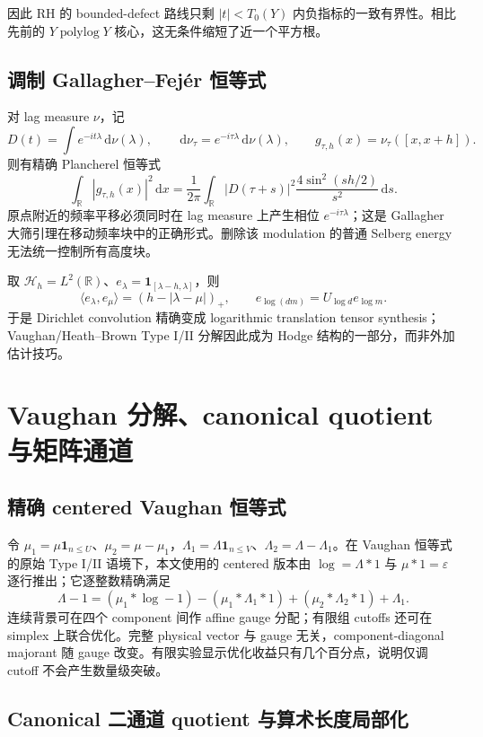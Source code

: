 \documentclass[UTF8,11pt,a4paper]{ctexart}
\theoremstyle{definition}
\theoremstyle{remark}
\newcommand{\R}{\mathbb R}
\newcommand{\dd}{\,\mathrm d}
\newcommand{\1}{\mathbf 1}
\newcommand{\cH}{\mathcal H}
\begin{document}
因此 RH 的 bounded-defect 路线只剩 $|t|<T_0(Y)$ 内负指标的一致有界性。相比先前的 $Y\operatorname{polylog}Y$ 核心，这无条件缩短了近一个平方根。

\subsection{调制 Gallagher--Fej\'er 恒等式}

对 lag measure $\nu$，记
\[
  D(t)=\int e^{-it\lambda}\dd\nu(\lambda),\qquad
  \dd\nu_\tau=e^{-i\tau\lambda}\dd\nu(\lambda),\qquad
  g_{\tau,h}(x)=\nu_\tau([x,x+h]).
\]
则有精确 Plancherel 恒等式
\[
 \int_\R|g_{\tau,h}(x)|^2\dd x
 =\frac1{2\pi}\int_\R|D(\tau+s)|^2
 \frac{4\sin^2(sh/2)}{s^2}\dd s.
\]
原点附近的频率平移必须同时在 lag measure 上产生相位 $e^{-i\tau\lambda}$；这是 Gallagher 大筛引理\cite{Gallagher}在移动频率块中的正确形式。删除该 modulation 的普通 Selberg energy 无法统一控制所有高度块。

取 $\cH_h=L^2(\R)$、$e_\lambda=\1_{[\lambda-h,\lambda]}$，则
\[
 \langle e_\lambda,e_\mu\rangle=(h-|\lambda-\mu|)_+,
 \qquad e_{\log(dm)}=U_{\log d}e_{\log m}.
\]
于是 Dirichlet convolution 精确变成 logarithmic translation tensor synthesis；Vaughan/Heath--Brown Type I/II 分解因此成为 Hodge 结构的一部分，而非外加估计技巧。

\section{Vaughan 分解、canonical quotient 与矩阵通道}

\subsection{精确 centered Vaughan 恒等式}

令 $\mu_1=\mu\1_{n\leq U}$、$\mu_2=\mu-\mu_1$，$\Lambda_1=\Lambda\1_{n\leq V}$、$\Lambda_2=\Lambda-\Lambda_1$。在 Vaughan 恒等式的原始 Type I/II 语境\cite{Vaughan}下，本文使用的 centered 版本由 $\log=\Lambda*1$ 与 $\mu*1=\varepsilon$ 逐行推出；它逐整数精确满足
\[
\boxed{
\Lambda-1=(\mu_1*\log-1)-(\mu_1*\Lambda_1*1)
 +(\mu_2*\Lambda_2*1)+\Lambda_1.}
\]
连续背景可在四个 component 间作 affine gauge 分配；有限组 cutoffs 还可在 simplex 上联合优化。完整 physical vector 与 gauge 无关，component-diagonal majorant 随 gauge 改变。有限实验显示优化收益只有几个百分点，说明仅调 cutoff 不会产生数量级突破。

\subsection{Canonical 二通道 quotient 与算术长度局部化}
\end{document}
